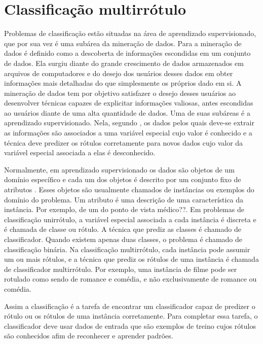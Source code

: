 \chapter{Classificação multirrótulo}

Problemas de classificação estão situadas na área de aprendizado supervisionado, que por sua vez é uma 
subárea da mineração de dados. Para \cite{dunham2003introductory} a mineração de dados é definido como a descoberta
de informações escondidas em um conjunto de dados. Ela surgiu diante do grande crescimento de dados armazenados
em arquivos de computadores e do desejo dos usuários desses dados em obter informações mais detalhadas do que simplesmente
os próprios dado em si. A mineração de dados tem por objetivo satisfazer o desejo desses usuários ao desenvolver técnicas
capazes de explicitar informações valiosas, antes escondidas ao usuários diante de uma alta quantidade de dados.
Uma de suas subáreas é a aprendizado supervisionado. Nela, segundo \cite{mohri2012foundations},
os dados pelos quais deve-se extrair as informações são associados a uma variável especial cujo valor
é conhecido e a técnica deve predizer os rótulos
corretamente para novos dados cujo valor da variável especial associada a elas é desconhecido.

Normalmente, em aprendizado supervisionado os dados são objetos de um domínio específico e cada um dos objetos
é descrito por um conjunto fixo de atributos \cite{rezende2003sistemas}. 
Esses objetos são usualmente chamados de instâncias ou exemplos do domínio do problema.
Um atributo é uma descrição de uma característica da instância.
Por exemplo, de um do ponto de vista médico??.
Em problemas de classificação unirrótulo, a variável especial associada a cada instância é discreta
e é chamada de classe ou rótulo. A técnica que prediz as classes é chamado de classificador.
Quando existem apenas duas classes, o problema é chamado de classificação binária.
Na classificação multirrótulo, cada instância pode assumir um ou mais rótulos, e a técnica
que prediz os rótulos de uma instância é chamada de classificador multirrótulo.
Por exemplo, uma instância de filme pode ser rotulado como sendo de romance e comédia, 
e não exclusivamente de romance ou comédia.

Assim a classificação é a tarefa de encontrar um classificador capaz de predizer 
o rótulo ou os rótulos de uma instância corretamente.
Para completar essa tarefa, o classificador deve usar dados de entrada que são exemplos
de treino cujos rótulos são conhecidos afim de
reconhecer e aprender padrões.

